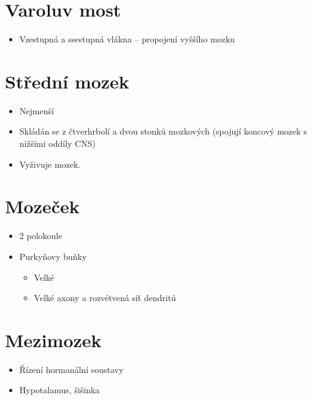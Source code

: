 \documentclass[a4]{article}
\begin{document}
\section{Varoluv most}
\begin{itemize}
	\item Vzestupná a ssestupná vlákna -- propojení vyššího mozku
\end{itemize}
\section{Střední mozek}
\begin{itemize}
	\item Nejmenší
	\item Skládán se z čtverhrbolí a dvou stonků mozkových (spojují koncový mozek s nižšími oddíly CNS)
	\item Vyživuje mozek.
\end{itemize}
\section{Mozeček}
\begin{itemize}
	\item 2 polokoule
	\item Purkyňovy buňky
		\begin{itemize}
			\item Velké
			\item Velké axony a rozvétvená síť dendritů
		\end{itemize}
\end{itemize}
\section{Mezimozek}
\begin{itemize}
	\item Řízení hormanální soustavy
	\item Hypotalamus, šišinka
\end{itemize}
\end{document}

